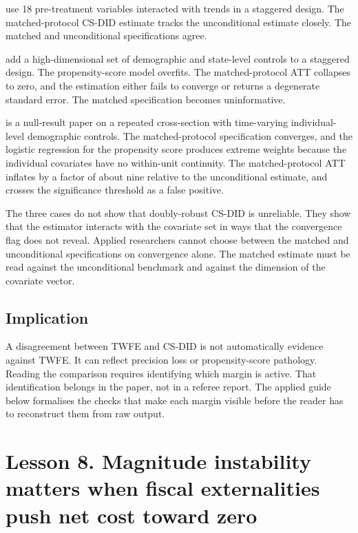 \textcite{carrillo2019provider} use 18 pre-treatment variables interacted with trends in a staggered design. The matched-protocol CS-DID estimate tracks the unconditional estimate closely. The matched and unconditional specifications agree.

\textcite{carpenter2019direct} add a high-dimensional set of demographic and state-level controls to a staggered design. The propensity-score model overfits. The matched-protocol ATT collapses to zero, and the estimation either fails to converge or returns a degenerate standard error. The matched specification becomes uninformative.

\textcite{levine2011effective} is a null-result paper on a repeated cross-section with time-varying individual-level demographic controls. The matched-protocol specification converges, and the logistic regression for the propensity score produces extreme weights because the individual covariates have no within-unit continuity. The matched-protocol ATT inflates by a factor of about nine relative to the unconditional estimate, and crosses the significance threshold as a false positive.

The three cases do not show that doubly-robust CS-DID is unreliable. They show that the estimator interacts with the covariate set in ways that the convergence flag does not reveal. Applied researchers cannot choose between the matched and unconditional specifications on convergence alone. The matched estimate must be read against the unconditional benchmark and against the dimension of the covariate vector.

\subsection{Implication}

A disagreement between TWFE and CS-DID is not automatically evidence against TWFE. It can reflect precision loss or propensity-score pathology. Reading the comparison requires identifying which margin is active. That identification belongs in the paper, not in a referee report. The applied guide below formalises the checks that make each margin visible before the reader has to reconstruct them from raw output.







\newpage
\section{Lesson 8. Magnitude instability matters when fiscal externalities push net cost toward zero}
\label{sec:mvpf_stress_test}

